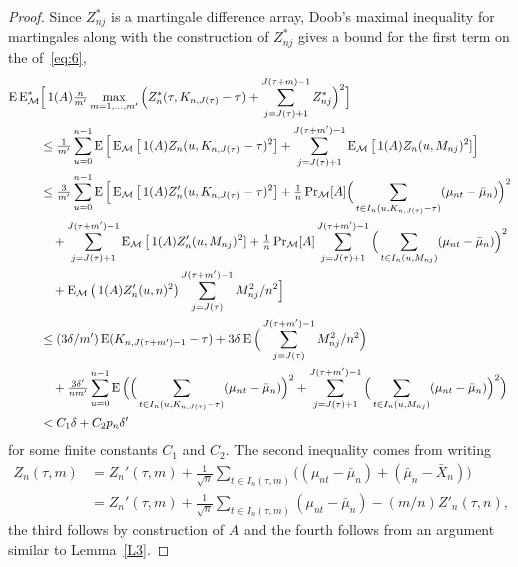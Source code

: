 \documentclass[11pt]{article}
\begin{document}
\begin{proof}
  Since $Z_{nj}^*$ is a martingale difference array, Doob's maximal
  inequality for martingales \citep[see][Theorem 15.15, for
  example]{Dav:94} along with the construction of $Z_{nj}^{*}$ gives
  a bound for the first term on the  of~\eqref{eq:6},
  \begin{align*}
  \operatorname{E} \operatorname{E}_{\mathcal{M}}^* & \Big[\operatorname{1}(A) \tfrac{n}{m'}\max_{m = 1,\dots, m'}
  \Big(Z_n^*(\tau, K_{n,J(\tau)} - \tau)
  + \sum_{j=J(\tau)+1}^{J(\tau + m)-1} Z_{nj}^*\Big)^2\Big] \\
  &\leq \tfrac{1}{m'} \sum_{u = 0}^{n-1} \operatorname{E} \Big[\operatorname{E}_{\mathcal{M}} \big[
  \operatorname{1}(A) Z_n(u, K_{n,J(\tau)} - \tau)^2\big] +
  \sum_{j=J(\tau)+1}^{J(\tau + m')-1} \operatorname{E}_{\mathcal{M}} \big[\operatorname{1}(A) Z_n(u, M_{nj})^2]\Big] \\
  &\leq \tfrac{3}{m'} \sum_{u = 0}^{n-1} \operatorname{E}\Big[\operatorname{E}_{\mathcal{M}}\big[
  \operatorname{1}(A) Z'_n(u, K_{n,J(\tau)} - \tau)^2\big]
  + \tfrac{1}{n} \operatorname{Pr}_{\mathcal{M}}[A] \Big(\sum_{t \in I_n(u, K_{n,J(\tau)} - \tau)}
  (\mu_{nt} - \bar \mu_n)\Big)^2 \\
  & \quad+ \sum_{j=J(\tau)+1}^{J(\tau + m')-1}
  \operatorname{E}_{\mathcal{M}} \big[\operatorname{1}(A) Z_n'(u, M_{nj})^2]
  + \tfrac{1}{n} \operatorname{Pr}_{\mathcal{M}}[A]
  \sum_{j=J(\tau)+1}^{J(\tau + m')-1}\Big( \sum_{t \in I_n(u,M_{nj})}
  (\mu_{nt} - \bar{\mu}_n) \Big)^2 \\
  & \quad+ \operatorname{E}_{\mathcal{M}}\big( \operatorname{1}(A) Z_n'(u, n)^2 \big)
  \sum_{j=J(\tau)}^{J(\tau+m')-1} M_{nj}^2/n^2 \Big] \\
  &\leq (3\delta/m') \operatorname{E} (K_{n,J(\tau+m')-1} - \tau)
    + 3\delta \operatorname{E}\Big(\sum_{j=J(\tau)}^{J(\tau+m')-1} M_{nj}^2/n^2 \Big) \\
  &\quad+ \tfrac{3\delta'}{nm'} \sum_{u=0}^{n-1}\operatorname{E}\Big( \Big(\sum_{t \in I_n(u, K_{n,J(\tau)} - \tau)}
  (\mu_{nt} - \bar \mu_n)\Big)^2 +
  \sum_{j=J(\tau)+1}^{J(\tau + m')-1}\Big( \sum_{t \in I_n(u,M_{nj})}
  (\mu_{nt} - \bar{\mu}_n) \Big)^2 \Big) \\
  & < C_1 \delta + C_2 p_n \delta'
  \end{align*}
  for some finite constants $C_1$ and $C_2$.
  The second inequality comes from writing
  \begin{align*}
    Z_n(\tau, m) &= Z_n'(\tau, m)
    + \tfrac{1}{\sqrt{n}} \sum_{t \in I_n(\tau, m)}
    \big((\mu_{nt} - \bar \mu_n) + (\bar \mu_n - \bar X_n)\big) \\
    &= Z_n'(\tau, m)
    + \tfrac{1}{\sqrt{n}} \sum_{t \in I_n(\tau, m)} (\mu_{nt} - \bar \mu_n)
    - (m/n) Z'_n(\tau, n),
  \end{align*}
  the third follows by construction of $A$
  and the fourth follows from an argument similar to Lemma~\ref{L3}.


\end{proof}
\end{document}
